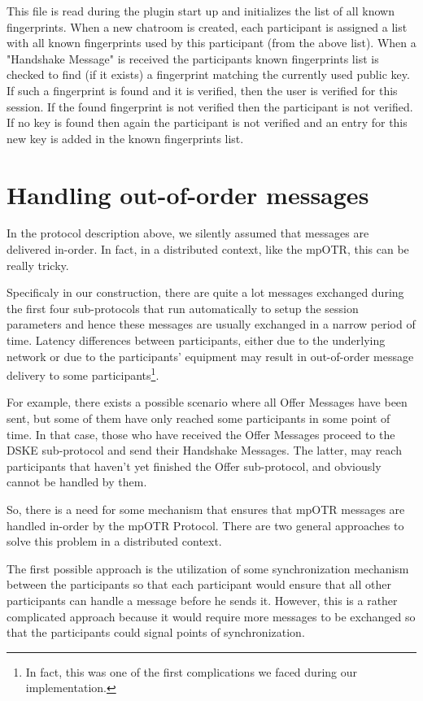 This file is read during the plugin start up and initializes the list of all known fingerprints.
When a new chatroom is created, each participant is assigned a list with all known fingerprints used by this participant (from the above list).
When a "Handshake Message" is received the participants known fingerprints list is checked to find (if it exists) a fingerprint matching the currently used public key.
If such a fingerprint is found and it is verified, then the user is verified for this session.
If the found fingerprint is not verified then the participant is not verified.
If no key is found then again the participant is not verified and an entry for this new key is added in the known fingerprints list. 

\section{Handling out-of-order messages}
In the protocol description above, we silently assumed that messages are delivered in-order. In fact, in a distributed context, like the mpOTR, this can be really tricky.

Specificaly in our construction, there are quite a lot messages exchanged during the first four sub-protocols that run automatically to setup the session parameters and hence these messages are usually exchanged in a narrow period of time. Latency differences between participants, either due to the underlying network or due to the participants' equipment may result in out-of-order message delivery to some participants\footnote{In fact, this was one of the first complications we faced during our implementation.}.

For example, there exists a possible scenario where all Offer Messages have been sent, but some of them have only reached some participants in some point of time. In that case, those who have received the Offer Messages proceed to the DSKE sub-protocol and send their Handshake Messages. The latter, may reach participants that haven't yet finished the Offer sub-protocol, and obviously cannot be handled by them.

So, there is a need for some mechanism that ensures that mpOTR messages are handled in-order by the mpOTR Protocol. There are two general approaches to solve this problem in a distributed context.

The first possible approach is the utilization of some synchronization mechanism between the participants so that each participant would ensure that all other participants can handle a message before he sends it. However, this is a rather complicated approach because it would require more messages to be exchanged so that the participants could signal points of synchronization.

